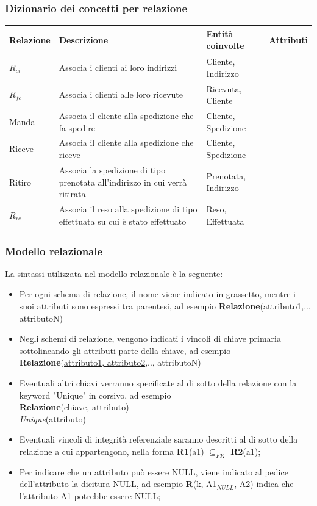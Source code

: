 \subsubsection*{Dizionario dei concetti per relazione}
\begin{table}[H]
	\centering
	\begin{tabularx}{\dimexpr{}\arrayrulewidth}{|*{4}{Y|}} %
		\hline
		\textbf{Relazione} & \textbf{Descrizione} & \textbf{Entità coinvolte} & \textbf{Attributi} \\ \hline
		$R_{ci}$ & Associa i clienti ai loro indirizzi & Cliente, Indirizzo & \\ 
    \hline
    $R_{fc}$ & Associa i clienti alle loro ricevute & Ricevuta, Cliente & \\
    \hline
    Manda & Associa il cliente alla spedizione che fa spedire & Cliente, Spedizione & \\
    \hline 
    Riceve & Associa il cliente alla spedizione che riceve & Cliente, Spedizione & \\
    \hline
    Ritiro & Associa la spedizione di tipo prenotata all'indirizzo in cui verrà ritirata & Prenotata, Indirizzo & \\
    \hline 
    $R_{re}$ & Associa il reso alla spedizione di tipo effettuata su cui è stato effettuato & Reso, Effettuata & \\ \hline 
	\end{tabularx}
\end{table}

\subsubsection{Modello relazionale}
La sintassi utilizzata nel modello relazionale è la seguente:
\begin{itemize}
  \item Per ogni schema di relazione, il nome viene indicato in grassetto, mentre i suoi attributi sono espressi tra parentesi, ad esempio \textbf{Relazione}(attributo1,.., attributoN)
  \item Negli schemi di relazione, vengono indicati i vincoli di chiave primaria sottolineando gli attributi parte della chiave, ad esempio \textbf{Relazione}(\underline{attributo1, attributo2},.., attributoN)
  \item Eventuali altri chiavi verranno specificate al di sotto della relazione con la keyword "Unique" in corsivo, ad esempio \\ \textbf{Relazione}(\underline{chiave}, attributo)\\ \textit{Unique}(attributo)
  \item Eventuali vincoli di integrità referenziale saranno descritti al di sotto della relazione a cui appartengono, nella forma \textbf{R1}(a1) $\subseteq _{FK}$ \textbf{R2}(a1);
  \item Per indicare che un attributo può essere NULL, viene indicato al pedice dell'attributo la dicitura NULL, ad esempio \textbf{R}(\underline{k}, A1$_{NULL}$, A2) indica che l'attributo A1 potrebbe essere NULL;
\end{itemize}

